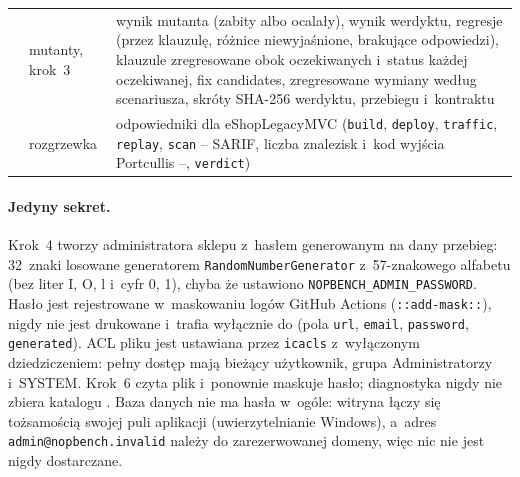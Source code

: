 {\begin{xltabular}{\linewidth}{@{}>{\raggedright\arraybackslash}p{3.4cm} l >{\raggedright\arraybackslash}X@{}}
 & mutanty, krok~3 & wynik mutanta (zabity albo ocalały), wynik werdyktu,
  regresje (przez klauzulę, różnice niewyjaśnione, brakujące odpowiedzi), klauzule
  zregresowane obok oczekiwanych i~status każdej oczekiwanej, fix candidates, zregresowane
  wymiany według scenariusza, skróty SHA-256 werdyktu, przebiegu i~kontraktu \\
 & rozgrzewka & odpowiedniki dla eShopLegacyMVC (\texttt{build},
  \texttt{deploy}, \texttt{traffic}, \texttt{replay}, \texttt{scan} -- SARIF, liczba
  znalezisk i~kod wyjścia Portcullis --, \texttt{verdict}) \\
\end{xltabular}
}

\paragraph{Jedyny sekret.} Krok~4 tworzy administratora sklepu z~hasłem generowanym na
dany przebieg: 32~znaki losowane generatorem \texttt{RandomNumberGenerator}
z~57-znakowego alfabetu (bez liter I, O, l i~cyfr 0, 1), chyba że ustawiono
\texttt{NOPBENCH\_ADMIN\_PASSWORD}. Hasło jest rejestrowane w~maskowaniu logów GitHub
Actions (\texttt{::add-mask::}), nigdy nie jest drukowane i~trafia wyłącznie do
 (pola \texttt{url}, \texttt{email},
\texttt{password}, \texttt{generated}). ACL pliku jest ustawiana przez \texttt{icacls}
z~wyłączonym dziedziczeniem: pełny dostęp mają bieżący użytkownik, grupa Administratorzy
i~SYSTEM. Krok~6 czyta plik i~ponownie maskuje hasło; diagnostyka nigdy nie zbiera
katalogu . Baza danych nie ma hasła w~ogóle: witryna łączy się tożsamością
swojej puli aplikacji (uwierzytelnianie Windows), a~adres \texttt{admin@nopbench.invalid}
należy do zarezerwowanej domeny, więc nic nie jest nigdy dostarczane.



